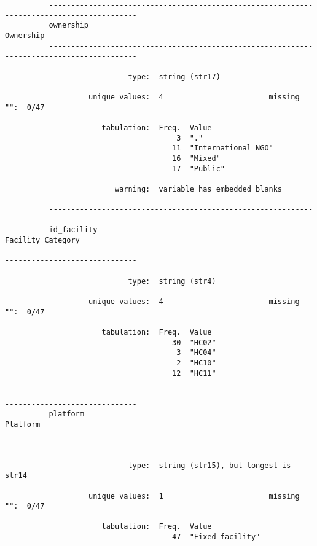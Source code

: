 \documentclass{article}
\begin{document}
\begin{verbatim}
          ------------------------------------------------------------------------------------------
          ownership                                                                        Ownership
          ------------------------------------------------------------------------------------------
          
                            type:  string (str17)
          
                   unique values:  4                        missing "":  0/47
          
                      tabulation:  Freq.  Value
                                       3  "."
                                      11  "International NGO"
                                      16  "Mixed"
                                      17  "Public"
          
                         warning:  variable has embedded blanks
          
          ------------------------------------------------------------------------------------------
          id_facility                                                              Facility Category
          ------------------------------------------------------------------------------------------
          
                            type:  string (str4)
          
                   unique values:  4                        missing "":  0/47
          
                      tabulation:  Freq.  Value
                                      30  "HC02"
                                       3  "HC04"
                                       2  "HC10"
                                      12  "HC11"
          
          ------------------------------------------------------------------------------------------
          platform                                                                          Platform
          ------------------------------------------------------------------------------------------
          
                            type:  string (str15), but longest is str14
          
                   unique values:  1                        missing "":  0/47
          
                      tabulation:  Freq.  Value
                                      47  "Fixed facility"
          

\end{verbatim}
\end{document}
